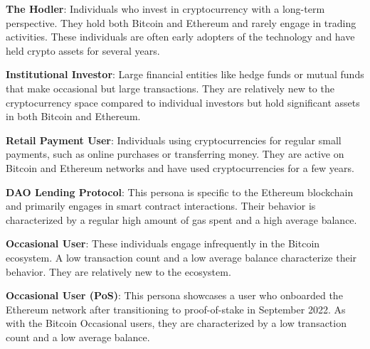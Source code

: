 \documentclass[11pt]{report}
\begin{document}
\textbf{The Hodler}: Individuals who invest in cryptocurrency with a long-term perspective. They hold both Bitcoin and Ethereum and rarely engage in trading activities. These individuals are often early adopters of the technology and have held crypto assets for several years.

\textbf{Institutional Investor}: Large financial entities like hedge funds or mutual funds that make occasional but large transactions. They are relatively new to the cryptocurrency space compared to individual investors but hold significant assets in both Bitcoin and Ethereum.

\textbf{Retail Payment User}: Individuals using cryptocurrencies for regular small payments, such as online purchases or transferring money. They are active on Bitcoin and Ethereum networks and have used cryptocurrencies for a few years.

\textbf{DAO Lending Protocol}: This persona is specific to the Ethereum blockchain and primarily engages in smart contract interactions. Their behavior is characterized by a regular high amount of gas spent and a high average balance.

\textbf{Occasional User}: These individuals engage infrequently in the Bitcoin ecosystem. A low transaction count and a low average balance characterize their behavior. They are relatively new to the ecosystem.

\textbf{Occasional User (PoS)}: This persona showcases a user who onboarded the Ethereum network after transitioning to proof-of-stake in September 2022. As with the Bitcoin Occasional users, they are characterized by a low transaction count and a low average balance.
\end{document}

